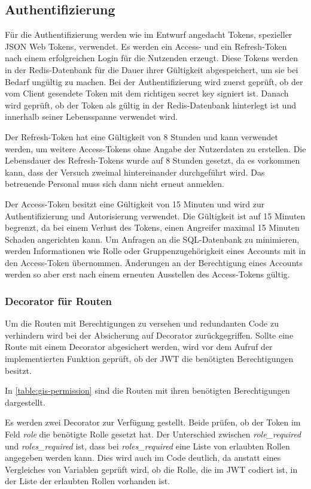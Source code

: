 \subsection{Authentifizierung}\label{sub:realisierung-authentifizierung}

Für die Authentifizierung werden wie im Entwurf angedacht Tokens, spezieller JSON Web Tokens, verwendet. Es werden ein Access- und ein Refresh-Token nach einem erfolgreichen Login für die Nutzenden erzeugt. Diese Tokens werden in der Redis-Datenbank für die Dauer ihrer Gültigkeit abgespeichert, um sie bei Bedarf ungültig zu machen. Bei der Authentifizierung wird zuerst geprüft, ob der vom Client gesendete Token mit dem richtigen secret key signiert ist. Danach wird geprüft, ob der Token als gültig in der Redis-Datenbank hinterlegt ist und innerhalb seiner Lebensspanne verwendet wird.

Der Refresh-Token hat eine Gültigkeit von 8 Stunden und kann verwendet werden, um weitere Access-Tokens ohne Angabe der Nutzerdaten zu erstellen. Die Lebensdauer des Refresh-Tokens wurde auf 8 Stunden gesetzt, da es vorkommen kann, dass der Versuch zweimal hintereinander durchgeführt wird. Das betreuende Personal muss sich dann nicht erneut anmelden.

Der Access-Token besitzt eine Gültigkeit von 15 Minuten und wird zur Authentifizierung und Autorisierung verwendet. Die Gültigkeit ist auf 15 Minuten begrenzt, da bei einem Verlust des Tokens, einen Angreifer maximal 15 Minuten Schaden angerichten kann. Um Anfragen an die SQL-Datenbank zu minimieren, werden Informationen wie Rolle oder Gruppenzugehörigkeit eines Accounts mit in den Access-Token übernommen. Änderungen an der Berechtigung eines Accounts werden so aber erst nach einem erneuten Ausstellen des Access-Tokens gültig.

\subsubsection{Decorator für Routen}
Um die Routen mit Berechtigungen zu versehen und redundanten Code zu verhindern wird bei der Absicherung auf Decorator zurückgegriffen. Sollte eine Route mit einem Decorator abgesichert werden, wird vor dem Aufruf der implementierten Funktion geprüft, ob der JWT die benötigten Berechtigungen besitzt.

In \autoref{table:gis-permission} sind die Routen mit ihren benötigten Berechtigungen dargestellt.

Es werden zwei Decorator zur Verfügung gestellt. Beide prüfen, ob der Token im Feld \textit{role} die benötigte Rolle gesetzt hat. Der Unterschied zwischen \textit{role\_required} und \textit{roles\_required} ist, dass bei \textit{roles\_required} eine Liste von erlaubten Rollen angegeben werden kann. Dies wird auch im Code deutlich, da anstatt eines Vergleiches von Variablen geprüft wird, ob die Rolle, die im JWT codiert ist, in der Liste der erlaubten Rollen vorhanden ist.

